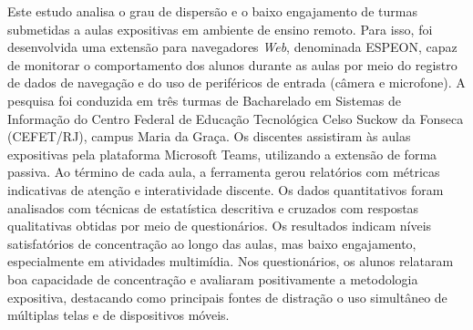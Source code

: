 
Este estudo analisa o grau de dispersão e o baixo engajamento de turmas submetidas a aulas expositivas em ambiente de ensino remoto. Para isso, foi desenvolvida uma extensão para navegadores \textit{Web}, denominada ESPEON, capaz de monitorar o comportamento dos alunos durante as aulas por meio do registro de dados de navegação e do uso de periféricos de entrada (câmera e microfone). A pesquisa foi conduzida em três turmas de Bacharelado em Sistemas de Informação do Centro Federal de Educação Tecnológica Celso Suckow da Fonseca (CEFET/RJ), campus Maria da Graça. Os discentes assistiram às aulas expositivas pela plataforma Microsoft Teams, utilizando a extensão de forma passiva. Ao término de cada aula, a ferramenta gerou relatórios com métricas indicativas de atenção e interatividade discente. Os dados quantitativos foram analisados com técnicas de estatística descritiva e cruzados com respostas qualitativas obtidas por meio de questionários. Os resultados indicam níveis satisfatórios de concentração ao longo das aulas, mas baixo engajamento, especialmente em atividades multimídia. Nos questionários, os alunos relataram boa capacidade de concentração e avaliaram positivamente a metodologia expositiva, destacando como principais fontes de distração o uso simultâneo de múltiplas telas e de dispositivos móveis.
